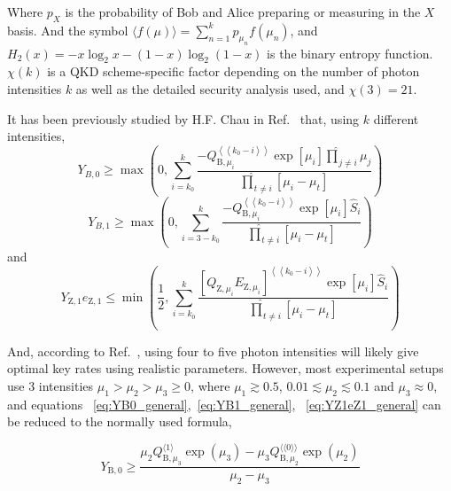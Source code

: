 \documentclass[%
 reprint,
superscriptaddress,
 amsmath,amssymb,
 aps,
]{revtex4-2}
\begin{document}
Where $p_X$ is the probability of Bob and Alice preparing or measuring in the $X$ basis. And the symbol $\langle f(\mu)\rangle = \sum_{n=1}^k p_{\mu_n} f(\mu_n)$, and $H_2(x)=-x\log_2x-(1-x)\log_2(1-x)$ is the binary entropy function. $\chi(k)$ is a QKD scheme-specific factor depending on the number of photon intensities $k$ as well as the detailed security analysis used, and $\chi(3)=21$.

It has been previously studied by H.F. Chau in Ref.~\cite{Decoy_state_key_rate1} that, using $k$ different intensities,
\begin{equation}
    Y_{B, 0} \geqslant \max \left(0, \sum_{i=k_0}^k \frac{-Q_{\mathrm{B}, \mu_i}^{\left\langle\left\langle k_0-i\right\rangle\right\rangle} \exp \left[\mu_i\right] \hat{\prod}_{j \neq i} \mu_j}{\hat{\prod}_{t \neq i}\left[\mu_i-\mu_t\right]}\right)
    \label{eq:YB0_general}
\end{equation}
\begin{equation}
    Y_{B, 1} \geqslant \max \left(0, \sum_{i=3-k_0}^k \frac{-Q_{\mathrm{B}, \mu_i}^{\left\langle\left\langle k_0-i\right\rangle\right\rangle} \exp \left[\mu_i\right] \hat{S}_i}{\hat{\prod}_{t \neq i}\left[\mu_i-\mu_t\right]}\right)
    \label{eq:YB1_general}
\end{equation}
and
\begin{equation}
    Y_{\mathrm{Z}, 1} e_{\mathrm{Z}, 1} \leqslant \min \left(\frac{1}{2}, \sum_{i=k_0}^k \frac{\left[Q_{\mathrm{Z}, \mu_i} E_{\mathrm{Z}, \mu_i}\right]^{\left\langle\left\langle k_0-i\right\rangle\right\rangle} \exp \left[\mu_i\right] \hat{S}_i}{\hat{\prod}_{t \neq i}\left[\mu_i-\mu_t\right]}\right)
    \label{eq:YZ1eZ1_general}
\end{equation}

And, according to Ref.~\cite{Decoy_state_key_rate1}, using four to five photon intensities will likely give optimal key rates using realistic parameters. However, most experimental setups use 3 intensities $\mu_1>\mu_2>\mu_3\ge 0$, where $\mu_1\gtrsim0.5$, $0.01\lesssim\mu_2\lesssim0.1$ and $\mu_3\approx0$, and equations ~\ref{eq:YB0_general},~\ref{eq:YB1_general}, ~\ref{eq:YZ1eZ1_general} can be reduced to the normally used formula,

\begin{equation}
    Y_{\mathrm{B}, 0} \geqslant \frac{\mu_2 Q_{\mathrm{B}, \mu_3}^{\langle 1\rangle} \exp \left(\mu_3\right)-\mu_3 Q_{\mathrm{B}, \mu_2}^{\langle\langle 0\rangle\rangle} \exp \left(\mu_2\right)}{\mu_2-\mu_3}
\end{equation}
\end{document}
